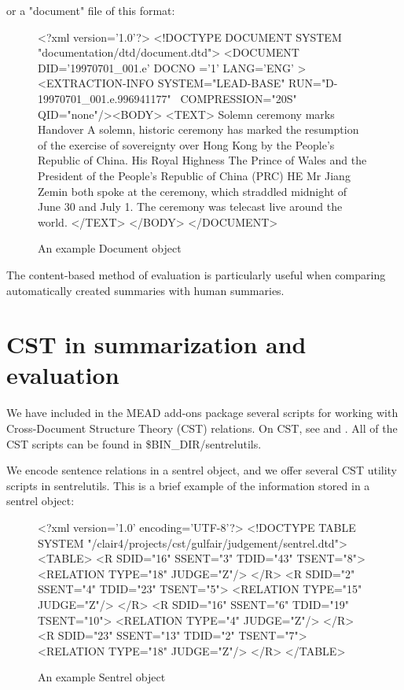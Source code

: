 \documentclass[10pt]{article}
\begin{document}
or a "document" file of this format:

\begin{figure}[htp!] 
\centering
\begin{boxedverbatim}
<?xml version='1.0'?>
<!DOCTYPE DOCUMENT SYSTEM "documentation/dtd/document.dtd">
<DOCUMENT DID='19970701_001.e' DOCNO ='1' LANG='ENG' >
<EXTRACTION-INFO SYSTEM="LEAD-BASE" RUN="D-19970701_001.e.996941177" \
COMPRESSION="20S" QID="none"/><BODY>
<TEXT>
 Solemn ceremony marks Handover
A solemn, historic ceremony has marked the resumption of the exercise 
of sovereignty over Hong Kong by the People's Republic of China.
His Royal Highness The Prince of Wales and the President of the People's 
Republic of China (PRC) HE Mr Jiang Zemin both spoke at the ceremony, 
which straddled midnight of June 30 and July 1.
The ceremony was telecast live around the world.
</TEXT>
</BODY>
</DOCUMENT>
\end{boxedverbatim}
\caption{An example Document object}
\label{figure:docobject}
\end{figure}

The content-based method of evaluation is particularly useful when 
comparing automatically created summaries with human summaries.

\section{CST in summarization and evaluation}
We have included in the MEAD add-ons package several scripts for working 
with Cross-Document Structure Theory (CST) relations.  On CST, see 
\cite{Radev00} and \cite{Zhang&al.02}.  All of the CST scripts can be found in \$BIN\_DIR/sentrelutils.

  We encode sentence relations in a sentrel object, and we offer several CST 
utility scripts in sentrelutils.  This is a brief example of the information
stored in a sentrel object:

\begin{figure}[htp!]
\centering
\begin{boxedverbatim}
<?xml version='1.0' encoding='UTF-8'?>
<!DOCTYPE TABLE SYSTEM "/clair4/projects/cst/gulfair/judgement/sentrel.dtd">
<TABLE>
<R SDID="16" SSENT="3" TDID="43" TSENT="8">
<RELATION TYPE="18" JUDGE="Z"/>
</R>
<R SDID="2" SSENT="4" TDID="23" TSENT="5">
<RELATION TYPE="15" JUDGE="Z"/>
</R>
<R SDID="16" SSENT="6" TDID="19" TSENT="10">
<RELATION TYPE="4" JUDGE="Z"/>
</R>
<R SDID="23" SSENT="13" TDID="2" TSENT="7">
<RELATION TYPE="18" JUDGE="Z"/>
</R>
</TABLE>
\end{boxedverbatim}  
\caption{An example Sentrel object}
\label{figure:sentrelexample}
\end{figure}
\end{document}
